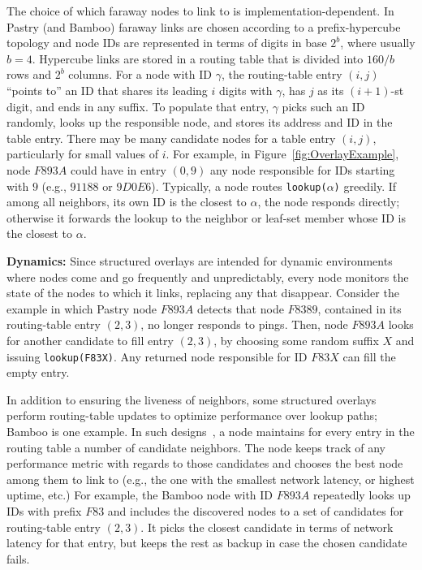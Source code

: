 \documentclass[10pt,twocolumn]{article}
\renewcommand{\paragraph}[1]{\textbf{#1:}}
\begin{document}
The choice of
which faraway nodes to link to is implementation-dependent.  In Pastry (and Bamboo) faraway links are
chosen according to a prefix-hypercube topology and
node IDs are represented in terms of digits in base $2^b$, where usually
$b=4$.  Hypercube links are stored in
a routing table that is divided into $160/b$ rows and
$2^b$ columns.  
For a node with ID $\gamma$, the routing-table
entry $(i, j)$ ``points to'' an ID that shares its leading $i$ digits
with $\gamma$, has $j$ as its $(i+1)$-st digit, and ends in any suffix. 
To populate that entry, $\gamma$ picks such an ID randomly, looks up the responsible
node, and stores its address and ID in the table entry.  There may be many candidate nodes for
a table entry $(i, j)$,
particularly for small values of $i$.  For example, in
Figure~\ref{fig:OverlayExample}, node $F893A$ could have in entry
$(0,9)$ any node
responsible for IDs starting with $9$ (e.g., $91188$ or $9D0E6$).
Typically, a node routes {\tt lookup($\alpha$)} greedily.  If among all
neighbors, its own ID is the closest to $\alpha$, the node responds
directly; otherwise it forwards the lookup to the neighbor or
leaf-set member whose ID is the closest to $\alpha$.

\paragraph{Dynamics}
Since structured overlays are intended for dynamic environments where nodes come and
go frequently and unpredictably, every node monitors the state of
the nodes to which it links, replacing any that disappear.
Consider the example in which Pastry node $F893A$ detects that
node $F8389$, contained in its routing-table entry $(2,3)$, no longer 
responds to pings.  Then, node $F893A$ looks for another candidate to
fill entry $(2,3)$, by choosing some random suffix $X$ and issuing  
{\tt lookup(F83X)}. Any
returned node responsible for ID $F83X$ can fill the empty entry.
 
In addition to ensuring the liveness of neighbors,
some structured overlays perform routing-table updates  to optimize
performance over lookup paths; Bamboo
is one example.  In such
designs~\cite{Gummadi2003b,Rhea2004}, a node maintains for every entry in
the routing table a number of candidate neighbors.  
The node keeps track of any performance metric with regards to those
candidates and chooses the 
best node among them to link to (e.g., the one with the smallest network 
latency, or highest uptime, etc.)  For example, the Bamboo node with ID
$F893A$ repeatedly looks up IDs with prefix $F83$ and includes the discovered
nodes to a set of candidates for routing-table entry $(2,3)$.  It picks
the closest candidate in terms of network latency for that entry, but keeps 
the rest as backup in case the chosen candidate fails.
\end{document}
